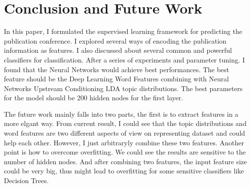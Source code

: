 \section{Conclusion and Future Work}
In this paper, I formulated the supervised learning framework for predicting
the publication conference. I explored several ways of encoding the publication
information as features. I also discussed about several common and powerful
classifiers for classification. After a series of experiments and
parameter tuning. I found that the Neural Networks would achieve best
performances. The best feature should be the Deep Learning Word Features
combining with Neural Networks Upstream Conditioning LDA topic distributions.
The best parameters for the model should be 200 hidden nodes for the first
layer.

The future work mainly falls into two parts, the first is to extract features in
a more elgant way. From current result, I could see that the topic distributions
and word features are two different aspects of view on representing dataset and
could help each other. However, I just arbitraryly combine these two features.
Another point is how to overcome overfitting. We could see the results are
sensitive to the number of hidden nodes. And after combining two features, the
input feature size could be very big, thus might lead to overfitting for some
sensitive classifiers like Decision Trees.
